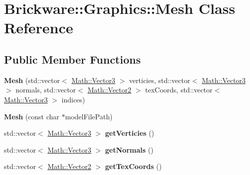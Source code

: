 \hypertarget{classBrickware_1_1Graphics_1_1Mesh}{}\section{Brickware\+:\+:Graphics\+:\+:Mesh Class Reference}
\label{classBrickware_1_1Graphics_1_1Mesh}
\subsection*{Public Member Functions}
\begin{DoxyCompactItemize}
\item 
\hypertarget{classBrickware_1_1Graphics_1_1Mesh_a43873375f8765f9d9bc22cba2b69eb1e}{}{\bfseries Mesh} (std\+::vector$<$ \hyperlink{classBrickware_1_1Math_1_1Vector3}{Math\+::\+Vector3} $>$ verticies, std\+::vector$<$ \hyperlink{classBrickware_1_1Math_1_1Vector3}{Math\+::\+Vector3} $>$ normals, std\+::vector$<$ \hyperlink{classBrickware_1_1Math_1_1Vector2}{Math\+::\+Vector2} $>$ tex\+Coords, std\+::vector$<$ \hyperlink{classBrickware_1_1Math_1_1Vector3}{Math\+::\+Vector3} $>$ indices)\label{classBrickware_1_1Graphics_1_1Mesh_a43873375f8765f9d9bc22cba2b69eb1e}

\item 
\hypertarget{classBrickware_1_1Graphics_1_1Mesh_a2381011a2a74e034653abb2c1d89137f}{}{\bfseries Mesh} (const char $\ast$model\+File\+Path)\label{classBrickware_1_1Graphics_1_1Mesh_a2381011a2a74e034653abb2c1d89137f}

\item 
\hypertarget{classBrickware_1_1Graphics_1_1Mesh_addd492859362e1d51d25d88fc743a383}{}std\+::vector$<$ \hyperlink{classBrickware_1_1Math_1_1Vector3}{Math\+::\+Vector3} $>$ {\bfseries get\+Verticies} ()\label{classBrickware_1_1Graphics_1_1Mesh_addd492859362e1d51d25d88fc743a383}

\item 
\hypertarget{classBrickware_1_1Graphics_1_1Mesh_ad028e4c19d148a635bb97170cb31c06d}{}std\+::vector$<$ \hyperlink{classBrickware_1_1Math_1_1Vector3}{Math\+::\+Vector3} $>$ {\bfseries get\+Normals} ()\label{classBrickware_1_1Graphics_1_1Mesh_ad028e4c19d148a635bb97170cb31c06d}

\item 
\hypertarget{classBrickware_1_1Graphics_1_1Mesh_a693d944cac22bdd2e8e71b41181e369c}{}std\+::vector$<$ \hyperlink{classBrickware_1_1Math_1_1Vector2}{Math\+::\+Vector2} $>$ {\bfseries get\+Tex\+Coords} ()\label{classBrickware_1_1Graphics_1_1Mesh_a693d944cac22bdd2e8e71b41181e369c}


\end{DoxyCompactItemize}
